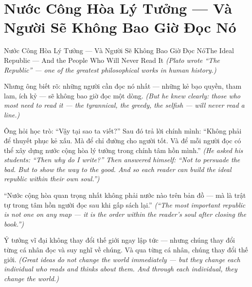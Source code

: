 \section{Nước Công Hòa Lý Tưởng — Và Người Sẽ Không Bao Giờ Đọc Nó}
\begin{truyen}{Nước Công Hòa Lý Tưởng — Và Người Sẽ Không Bao Giờ Đọc Nó}{The Ideal Republic — And the People Who Will Never Read It}
\textit{(Plato wrote ``The Republic'' — one of the greatest philosophical works in human history.)}

Nhưng ông biết rõ: những người cần đọc nó nhất — những kẻ bạo quyền, tham lam, ích kỷ — sẽ không bao giờ đọc một dòng.
\textit{(But he knew clearly: those who most need to read it — the tyrannical, the greedy, the selfish — will never read a line.)}

Ông hỏi học trò: ``Vậy tại sao ta viết?'' Sau đó trả lời chính mình: ``Không phải để thuyết phục kẻ xấu. Mà để chỉ đường cho người tốt. Và để mỗi người đọc có thể xây dựng nước cộng hòa lý tưởng trong chính tâm hồn mình.''
\textit{(He asked his students: ``Then why do I write?'' Then answered himself: ``Not to persuade the bad. But to show the way to the good. And so each reader can build the ideal republic within their own soul.'')}

``Nước cộng hòa quan trọng nhất không phải nước nào trên bản đồ — mà là trật tự trong tâm hồn người đọc sau khi gấp sách lại.''
\textit{(``The most important republic is not one on any map — it is the order within the reader's soul after closing the book.'')}

\end{truyen}

\begin{baihoc}
Ý tưởng vĩ đại không thay đổi thế giới ngay lập tức — nhưng chúng thay đổi từng cá nhân đọc và suy nghĩ về chúng. Và qua từng cá nhân, chúng thay đổi thế giới.
\textit{(Great ideas do not change the world immediately — but they change each individual who reads and thinks about them. And through each individual, they change the world.)}
\end{baihoc}
\ngancach

